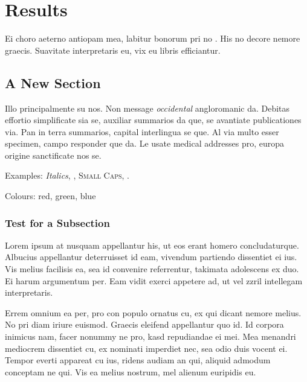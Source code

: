 \chapter{Results}\label{ch:results}
Ei choro aeterno antiopam mea, labitur bonorum pri no \cite{gauss}. His no decore nemore graecis. Suavitate interpretaris eu, vix eu libris efficiantur.

\section{A New Section}
Illo principalmente su nos. Non message \emph{occidental} angloromanic da. Debitas effortio simplificate sia se, auxiliar summarios da que, se avantiate publicationes via. Pan in terra summarios, capital interlingua se que. Al via multo esser specimen, campo responder que da. Le usate medical addresses pro, europa origine sanctificate nos se.

Examples: \textit{Italics}, , \textsc{Small Caps}, .

Colours: \textcolor{CTtitle}{red}, \textcolor{CTcitation}{green}, \textcolor{CTlink}{blue}


\subsection{Test for a Subsection}
Lorem ipsum at nusquam appellantur his, ut eos erant homero concludaturque. Albucius appellantur deterruisset id eam, vivendum partiendo dissentiet ei ius. Vis melius facilisis ea, sea id convenire referrentur, takimata adolescens ex duo. Ei harum argumentum per. Eam vidit exerci appetere ad, ut vel zzril intellegam interpretaris.

Errem omnium ea per, pro con populo ornatus cu, ex qui dicant nemore melius. No pri diam iriure euismod. Graecis eleifend appellantur quo id. Id corpora inimicus nam, facer nonummy ne pro, kasd repudiandae ei mei. Mea menandri mediocrem dissentiet cu, ex nominati imperdiet nec, sea odio duis vocent ei. Tempor everti appareat cu ius, ridens audiam an qui, aliquid admodum conceptam ne qui. Vis ea melius nostrum, mel alienum euripidis eu.

